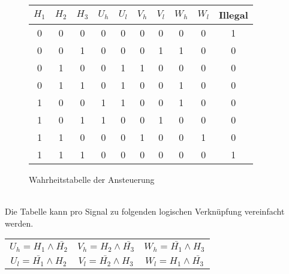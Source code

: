 \begin{figure}[h!]
\begin{tabular}{ccc||cc|cc|cc||c}
     $H_1$ & $H_2$ & $H_3$ & $U_h$ & $U_l$ & $V_h$ & $V_l$ & $W_h$ & $W_l$ & Illegal\\
\hline 0   &   0   &   0   &   0   &   0   &   0   &   0   &   0   &   0   &   1\\
       0   &   0   &   1   &   0   &   0   &   0   &   1   &   1   &   0   &   0\\
       0   &   1   &   0   &   0   &   1   &   1   &   0   &   0   &   0   &   0\\
       0   &   1   &   1   &   0   &   1   &   0   &   0   &   1   &   0   &   0\\
       1   &   0   &   0   &   1   &   1   &   0   &   0   &   1   &   0   &   0\\
       1   &   0   &   1   &   1   &   0   &   0   &   1   &   0   &   0   &   0\\
       1   &   1   &   0   &   0   &   0   &   1   &   0   &   0   &   1   &   0\\
       1   &   1   &   1   &   0   &   0   &   0   &   0   &   0   &   0   &   1\\
\end{tabular}
	\centering
	\caption{Wahrheitstabelle der Ansteuerung} 
\label{abb:WahrheitstabelleAnsteuerung}
\end{figure}\\
Die Tabelle kann pro Signal zu folgenden logischen Verknüpfung vereinfacht werden.\\
\begin{tabular}{ccc}
$U_h = H_1 \wedge \bar{H_2}$ & $V_h = H_2 \wedge \bar{H_3}$ & $W_h = \bar{H_1} \wedge H_3$\\
$U_l = \bar{H_1} \wedge H_2$ & $V_l = \bar{H_2} \wedge H_3$ & $W_l = H_1 \wedge \bar{H_3}$
\end{tabular}
